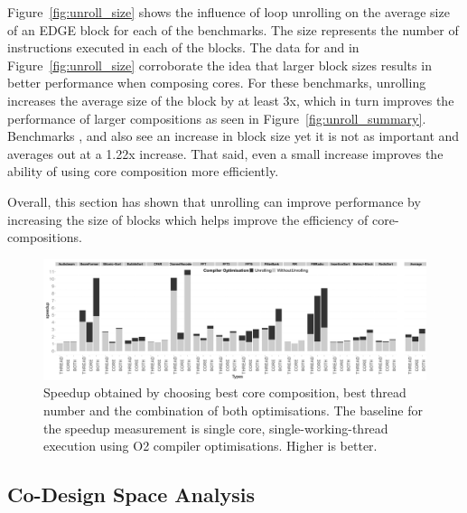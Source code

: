 Figure~\ref{fig:unroll_size} shows the influence of loop unrolling on the average size of an EDGE block for each of the benchmarks.
The size represents the number of instructions executed in each of the blocks.
The data for  and  in Figure~\ref{fig:unroll_size} corroborate the idea that larger block sizes results in better performance when composing cores.
For these benchmarks, unrolling increases the average size of the block by at least 3x, which in turn improves the performance of larger compositions as seen in Figure~\ref{fig:unroll_summary}.
Benchmarks ,  and  also see an increase in block size yet it is not as important and averages out at a 1.22x increase.
That said, even a small increase improves the ability of using core composition more efficiently.

Overall, this section has shown that unrolling can improve performance by increasing the size of blocks which helps improve the efficiency of core-compositions.

\begin{figure}[t]%
    \includegraphics[width=1\linewidth,keepaspectratio]{streamit-paper/graphics/threadcompbench.pdf}
    \caption{Speedup obtained by choosing best core composition, best
      thread number and the combination of both optimisations. The baseline for the speedup measurement is single core, single-working-thread execution using O2 compiler optimisations. Higher
      is better.}\label{fig:overviewhist}
\end{figure}
\subsection{Co-Design Space Analysis}


